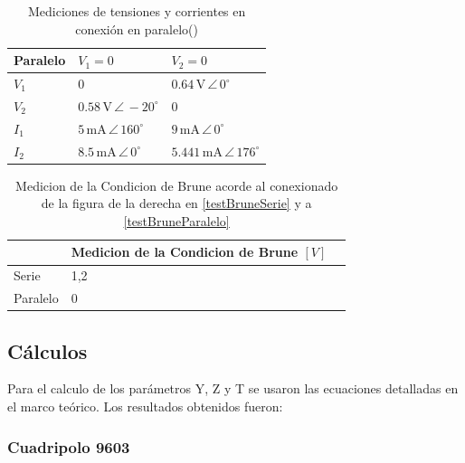 \begin{table}[H]
\centering
\begin{tabular}{|l|l|l|}
\hline
\textbf{Paralelo} & $V_1 = 0$ & $V_2 = 0$ \\ \hline
$V_1$ & $0$ & $0.64\,\mathrm{V}\,\angle\,0^\circ$ \\ \hline
$V_2$ & $0.58\,\mathrm{V}\,\angle\,-20^\circ$ & $0$ \\ \hline
$I_1$ & $5\,\mathrm{mA}\,\angle\,160^\circ$ & $9\,\mathrm{mA}\,\angle\,0^\circ$ \\ \hline
$I_2$ & $8.5\,\mathrm{mA}\,\angle\,0^\circ$ & $5.441\,\mathrm{mA}\,\angle\,176^\circ$ \\ \hline
\end{tabular}
\caption{Mediciones de tensiones y corrientes en conexión en paralelo()}
\label{tab:corrientes_tensiones_paralelo}
\end{table}



\begin{table}[H]
\centering
\begin{tabular}{|l|l|l|}
\hline
               & Medicion de la Condicion de Brune $[V]$\\ \hline
  Serie        & 1,2 \\ \hline
  Paralelo     & 0   \\ \hline
\end{tabular}
\caption{Medicion de la Condicion de Brune acorde al conexionado de la figura de la derecha en \ref{testBruneSerie} y a \ref{testBruneParalelo} }
\label{tab:medicionesTestBrune}
\end{table}


     
    \subsection{Cálculos}

	Para el calculo de los parámetros Y, Z y T se usaron las ecuaciones detalladas en el marco teórico. Los resultados obtenidos fueron:
	
	\subsubsection{Cuadripolo 9603}
	

